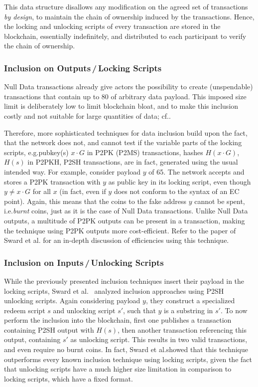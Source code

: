 \documentclass[a4paper,11pt,titlepage]{scrbook}
\begin{document}
This data structure disallows any modification on the agreed set of transactions \emph{by design}, to maintain the chain of ownership induced by the transactions.
Hence, the locking and unlocking scripts of every transaction are stored in the blockchain, essentially indefinitely, and distributed to each participant to verify the chain of ownership.

\subsubsection*{Inclusion on Outputs\,/\,Locking Scripts}

Null Data transactions already give actors the possibility to create (unspendable) transactions that contain up to \SI{80}{\byte} of arbitrary data payload. This imposed size limit is deliberately low to limit blockchain bloat, and to make this inclusion costly and not suitable for large quantities of data; cf.\@ \cite[155--156]{antonopoulos_mastering_2017}.

Therefore, more sophisticated techniques for data inclusion build upon the fact, that the network does not, and cannot test if the variable parts of the locking scripts, e.g.\@ pubkey(s) $x\cdot G$ in P2PK (P2MS) transactions, hashes $H(x\cdot G)$, $H(s)$ in P2PKH, P2SH transactions, are in fact, generated using the usual intended way.
For example, consider payload $y$ of \SI{65}{\byte}.
The network accepts and stores a P2PK transaction with $y$ as  public key in its locking script, even though $y\neq x\cdot G$ for all $x$ (in fact, even if $y$ does not conform to the syntax of an EC point).
Again, this means that the coins  to the fake address $y$ cannot be spent, i.e.\@ \emph{burnt} coins, just as it is the case of Null Data transactions.
Unlike Null Data outputs, a multitude of P2PK outputs can be present in a transaction, making the technique using P2PK outputs more cost-efficient.
Refer to the paper of Sward et al.\@ \cite{sward_data_2018} for an in-depth discussion of efficiencies using this technique.

\subsubsection*{Inclusion on Inputs\,/\,Unlocking Scripts}
While the previously presented inclusion techniques insert their payload in the locking scripts, Sward et al.~\cite{sward_data_2018} analyzed inclusion approaches using P2SH unlocking scripts.
Again considering payload $y$, they construct a specialized redeem script $s$ and unlocking script $s'$, such that $y$ is a substring in $s'$.
To now perform the inclusion into the blockchain, first one publishes a transaction containing P2SH output with $H(s)$, then another transaction referencing this output, containing $s'$ as unlocking script.
This results in two valid transactions, and even require no burnt coins.
In fact, Sward et al.\@ showed that this technique outperforms every known inclusion technique using locking scripts, given the fact that unlocking scripts have a much higher size limitation in comparison to locking scripts, which have a fixed format.
\end{document}
